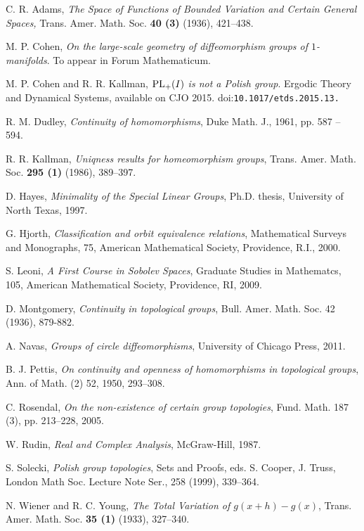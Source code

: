 \documentclass[12pt]{amsart}
\theoremstyle{definition}
\theoremstyle{remark}
\begin{document}
\begin{thebibliography}{99}

 C. R. Adams,
{\it The Space of Functions of Bounded Variation and Certain General Spaces,} Trans. Amer. Math. Soc. {\bf 40 (3)} (1936), 421--438.

 M. P. Cohen,
\textit{On the large-scale geometry of diffeomorphism groups of $1$-manifolds}.  To appear in Forum Mathematicum.

 M. P. Cohen and R. R. Kallman, 
\textit{$\mbox{\rm PL}_+(I)$ is not a Polish group}.  Ergodic Theory and Dynamical Systems, available on CJO 2015. doi:{\tt 10.1017/etds.2015.13.}

 R. M. Dudley,
{\it Continuity of homomorphisms}, Duke Math. J., 1961, pp. 587 -- 594.

 R. R. Kallman,
{\it Uniqness results for homeomorphism groups}, Trans. Amer. Math. Soc. {\bf 295 (1)} (1986), 389--397.

 D. Hayes,
{\it Minimality of the Special Linear Groups}, Ph.D. thesis, University of North Texas, 1997.

 G. Hjorth,
{\it Classification and orbit equivalence relations}, Mathematical Surveys and Monographs, 75, American Mathematical Society, Providence, R.I., 2000.

 S. Leoni,
{\it A First Course in Sobolev Spaces}, Graduate Studies in Mathematcs, 105, American Mathematical Society, Providence, RI, 2009.

 D. Montgomery,
{\it Continuity in topological groups}, Bull. Amer. Math. Soc. 42 (1936), 879-882.

 A. Navas,
{\it Groups of circle diffeomorphisms}, University of Chicago Press, 2011.

 B. J. Pettis,
{\it On continuity and openness of homomorphisms in topological groups}, Ann. of Math. (2) 52, 1950, 293--308.

 C. Rosendal,
{\it On the non-existence of certain group topologies}, Fund. Math. 187 (3), pp. 213--228, 2005.

 W. Rudin,
{\it Real and Complex Analysis}, McGraw-Hill, 1987.

 S. Solecki,
{\it Polish group topologies}, Sets and Proofs, eds. S. Cooper, J. Truss, London Math Soc. Lecture Note Ser., 258 (1999), 339--364.

 N. Wiener and R. C. Young,
{\it The Total Variation of $g(x + h) - g(x)$}, Trans. Amer. Math. Soc. {\bf 35 (1)} (1933), 327--340.

\end{thebibliography}
\end{document}
